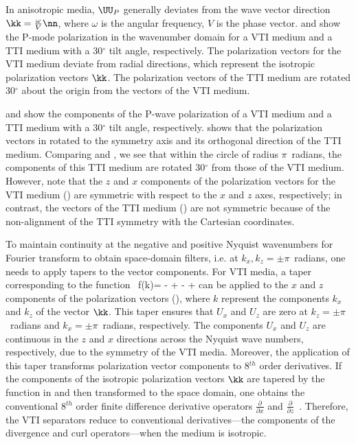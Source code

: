 In anisotropic media, $\UU_P$ generally deviates from the wave vector
direction $\kk=\frac{\omega}{V}\nn$, where $\omega$ is the angular
frequency, $V$ is the phase vector.  and 
show the P-mode polarization in the wavenumber domain for a VTI medium
and a TTI medium with a 30$^\circ$ tilt angle, respectively. The
polarization vectors for the VTI medium deviate from radial
directions, which represent the isotropic polarization vectors
$\kk$. The polarization vectors of the TTI medium are rotated
30$^\circ$ about the origin from the vectors of the VTI medium.


 and  show the components
of the P-wave polarization of a VTI medium and a TTI medium with a
30{$^\circ$} tilt angle, respectively.  shows
that the polarization vectors in  rotated to the
symmetry axis and its orthogonal direction of the TTI
medium. Comparing  and ,
we see that within the circle of radius $\pi$~radians, the components of this
TTI medium are rotated 30{$^\circ$} from those of the VTI
medium. However, note that the $z$ and $x$ components of the
polarization vectors for the VTI medium () are
symmetric with respect to the $x$ and $z$ axes, respectively; in
contrast, the vectors of the TTI medium () are
not symmetric because of the non-alignment of the TTI symmetry with
the Cartesian coordinates.


\def\sk#1{\sin\lp #1 k\rp}
\def\done#1#2{\frac{\partial#1}{\partial#2}}
To maintain continuity at the negative and positive Nyquist
wavenumbers for Fourier transform to obtain space-domain filters,
i.e. at $k_x,k_z=\pm\pi$~radians, one needs to apply tapers to the vector
components. For VTI media, a taper corresponding to the
function~\cite[]{yan:WB19}
\beq\label{sintaper}
f(k)= -\frac{8\sk{}}{5k} + \frac{2\sk{2}}{5k} -\frac{8\sk{3}}{105k}
+ \frac{\sk{4}}{140k}
\eeq
can be applied to the $x$ and $z$ components of the polarization
vectors (), where $k$ represent the components
$k_x$ and $k_z$ of the vector $\kk$.
This taper ensures that $U_x$ and $U_z$ 
are zero at $k_z=\pm\pi$~radians and $k_x=\pm\pi$~radians, respectively.  
The components $U_x$ and $U_z$ are continuous in the
$z$ and $x$ directions across the Nyquist wave numbers, respectively,
due to the symmetry of the VTI media.  
Moreover, the application of this taper transforms polarization vector 
components to 8$^{th}$ order derivatives.
If the components of the isotropic polarization vectors $\kk$ are
tapered by the function in  and then transformed to the
space domain, one obtains the conventional 8$^{th}$ order finite
difference derivative operators $\done{}{x}$ and
$\done{}{z}$~\cite[]{yan:WB19}. Therefore, the VTI separators reduce
to conventional derivatives---the components of the divergence and
curl operators---when the medium is isotropic.

